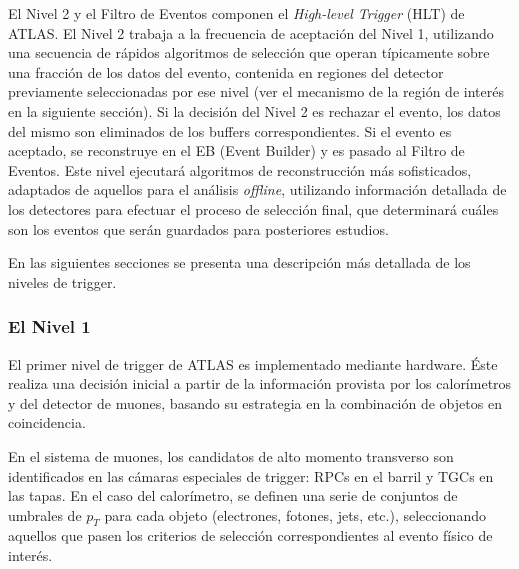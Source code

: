    El Nivel 2 y el Filtro de Eventos componen el \emph{High-level Trigger} (HLT) de ATLAS. El Nivel 2 trabaja a la frecuencia de aceptaci\'on del Nivel 1, utilizando una secuencia de r\'apidos algoritmos de selecci\'on que operan t\'ipicamente sobre una fracci\'on de los datos del evento, contenida en regiones del detector previamente seleccionadas por ese nivel (ver el mecanismo de la regi\'on de inter\'es en la siguiente secci\'on). Si la decisi\'on del Nivel 2 es rechazar el evento, los datos del mismo son eliminados de los buffers correspondientes. Si el evento es aceptado,  se reconstruye  en el EB (Event Builder) y es pasado al Filtro de Eventos. Este nivel ejecutar\'a algoritmos de reconstrucci\'on m\'as sofisticados, adaptados de aquellos para el an\'alisis \emph{offline}, utilizando informaci\'on detallada de los detectores para efectuar el proceso de selecci\'on final, que determinar\'a cu\'ales son los eventos que ser\'an guardados para posteriores estudios.

  En las siguientes secciones se presenta una descripci\'on m\'as detallada de los niveles de trigger.

 
\subsubsection{El Nivel 1}

   El primer nivel de trigger de ATLAS es implementado mediante hardware. \'Este realiza una decisi\'on inicial a partir de la informaci\'on provista por los calor\'imetros y del detector de muones, basando su estrategia en la combinaci\'on de objetos en coincidencia. %
  
   En el sistema de muones, los candidatos de alto momento transverso son identificados en las c\'amaras especiales de trigger: RPCs en el barril y TGCs en las tapas. En el caso del calor\'imetro, se definen una serie de conjuntos de umbrales de $p_T$ para cada objeto (electrones, fotones, jets, etc.), seleccionando aquellos que pasen los criterios de selecci\'on correspondientes al evento f\'isico de inter\'es. 

